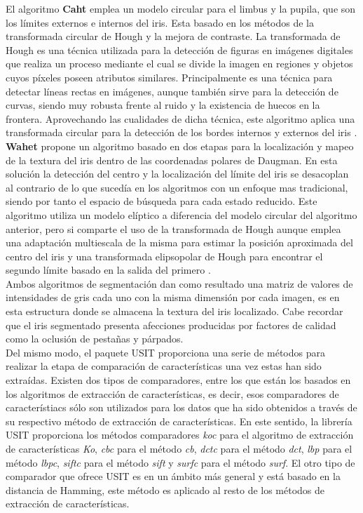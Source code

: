 El algoritmo \textbf{Caht} emplea un modelo circular para el limbus y la pupila, que son los límites externos e internos del iris. Esta basado en los métodos de la transformada circular de Hough y la mejora de contraste. La transformada de Hough es una técnica utilizada para la detección de figuras en imágenes digitales que realiza un proceso mediante el cual se divide la imagen en regiones y objetos cuyos píxeles poseen atributos similares. Principalmente es una técnica para detectar líneas rectas en imágenes, aunque también sirve para la detección de curvas, siendo muy robusta frente al ruido y la existencia de huecos en la frontera.  Aprovechando las cualidades de dicha técnica, este algoritmo aplica una transformada circular para la detección de los bordes internos y externos del iris \cite{Reference18}. \\

\textbf{Wahet}  propone un algoritmo basado en dos etapas para la localización y mapeo de la textura del iris dentro de las coordenadas polares de Daugman. En esta solución la detección del centro y la localización del límite del iris se desacoplan al contrario de lo que sucedía en los algoritmos con un enfoque mas tradicional, siendo por tanto el espacio de búsqueda para cada estado reducido. Este algoritmo utiliza un modelo elíptico a diferencia del modelo circular del algoritmo anterior, pero si comparte el uso de la transformada de Hough aunque emplea una adaptación multiescala de la misma para estimar la posición aproximada del centro del iris y una transformada elipsopolar de Hough para encontrar el segundo límite basado en la salida del primero \cite{Reference18}. \\

Ambos algoritmos de segmentación dan como resultado una matriz de valores de intensidades de gris cada uno con la misma dimensión por cada imagen, es en esta estructura donde se almacena la textura del iris localizado. Cabe recordar que el iris segmentado presenta afecciones producidas por factores de calidad como la oclusión de pestañas y párpados. \\

Del mismo modo, el paquete USIT proporciona una serie de métodos para realizar la etapa de comparación de características una vez estas han sido extraídas. Existen dos tipos de comparadores, entre los que están los basados en los algoritmos de extracción de características, es decir, esos comparadores de característiacs sólo son utilizados para los datos que ha sido obtenidos a través de su respectivo método de extracción de características. En este sentido, la librería USIT proporciona los métodos comparadores \textit{koc} para el algoritmo de extracción de características \textit{Ko}, \textit{cbc} para el método \textit{cb}, \textit{dctc} para el método \textit{dct}, \textit{lbp} para el método \textit{lbpc}, \textit{siftc} para el método \textit{sift} y \textit{surfc} para el método \textit{surf}. El otro tipo de comparador que ofrece USIT es en un ámbito más general y está basado en la distancia de Hamming, este método es aplicado al resto de los métodos de extracción de características. \\

